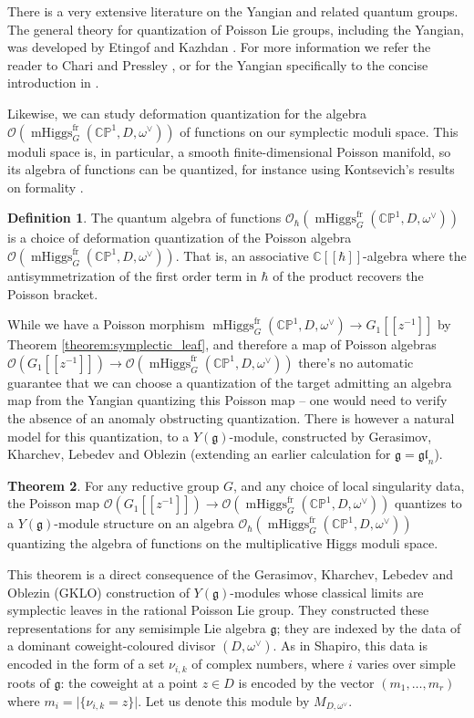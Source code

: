 \documentclass[11pt, oneside, reqno]{amsart}
\theoremstyle{definition} \newtheorem{definition}{Definition}[section]
\newtheorem{theorem}[definition]{Theorem}
\theoremstyle{definition} \newtheorem{remark}[definition]{Remark}
\theoremstyle{definition} \newtheorem{remarks}[definition]{Remarks}
\theoremstyle{definition} \newtheorem{question}[definition]{Question}
\theoremstyle{definition} \newtheorem*{note}{Note}
\theoremstyle{definition} \newtheorem{example}[definition]{Example}
\theoremstyle{definition} \newtheorem{examples}[definition]{Examples}
\renewcommand{\gg}{\mathfrak{g}}
\newcommand{\bb}[1]{\mathbb{#1}}
\newcommand{\CC}{\mathbb{C}}
\newcommand{\OO}{\mathcal{O}}
\newcommand{\gl}{\mathfrak{gl}}
\DeclareMathOperator{\mhiggs}{mHiggs}
\newcommand{\fr}{\mathrm{fr}}
\begin{document}
There is a very extensive literature on the Yangian and related quantum groups.  The general theory for quantization of Poisson Lie groups, including the Yangian, was developed by Etingof and Kazhdan \cite{EtingofKazhdanIII}.  For more information we refer the reader to Chari and Pressley \cite{ChariPressley}, or for the Yangian specifically to the concise introduction in \cite[Section 9]{CostelloYangian}.

Likewise, we can study deformation quantization for the algebra $\OO(\mhiggs^\fr_G(\bb{CP}^1,D,\omega^\vee))$ of functions on our symplectic moduli space.  This moduli space is, in particular, a smooth finite-dimensional Poisson manifold, so its algebra of functions can be quantized, for instance using Kontsevich's results on formality \cite{KontsevichQuantization}.

\begin{definition}
The quantum algebra of functions $\OO_\hbar(\mhiggs^\fr_G(\bb{CP}^1,D,\omega^\vee))$ is a choice of deformation quantization of the Poisson algebra $\OO(\mhiggs^\fr_G(\bb{CP}^1,D,\omega^\vee))$.  That is, an associative $\CC[[\hbar]]$-algebra where the antisymmetrization of the first order term in $\hbar$ of the product recovers the Poisson bracket. 
\end{definition}

While we have a Poisson morphism $\mhiggs^\fr_G(\bb{CP}^1,D,\omega^\vee) \to G_1[[z^{-1}]]$ by Theorem \ref{theorem:symplectic_leaf}, and therefore a map of Poisson algebras $\OO(G_1[[z^{-1}]]) \to \OO(\mhiggs^\fr_G(\bb{CP}^1,D,\omega^\vee))$ there's no automatic guarantee that we can choose a quantization of the target admitting an algebra map from the Yangian quantizing this Poisson map -- one would need to verify the absence of an anomaly obstructing quantization.  There is however a natural model for this quantization, to a $Y(\gg)$-module,  constructed by Gerasimov, Kharchev, Lebedev and Oblezin \cite{GKLO} (extending an earlier calculation \cite{GKL} for $\gg = \gl_n$).

\begin{theorem}
For any reductive group $G$, and any choice of local singularity data, the Poisson map $\OO(G_1[[z^{-1}]]) \to \OO(\mhiggs^\fr_G(\bb{CP}^1,D,\omega^\vee))$ quantizes to a $Y(\gg)$-module structure on an algebra $\OO_\hbar(\mhiggs^\fr_G(\bb{CP}^1,D,\omega^\vee))$ quantizing the algebra of functions on the multiplicative Higgs moduli space.  
\end{theorem}

This theorem is a direct consequence of the Gerasimov, Kharchev, Lebedev and Oblezin (GKLO) construction of $Y(\gg)$-modules whose classical limits are symplectic leaves in the rational Poisson Lie group.  They constructed these representations for any semisimple Lie algebra $\gg$; they are indexed by the data of a dominant coweight-coloured divisor $(D, \omega^\vee)$.  As in Shapiro, this data is encoded in the form of a set $\nu_{i,k}$ of complex numbers, where $i$ varies over simple roots of $\gg$: the coweight at a point $z \in D$ is encoded by the vector $(m_1, \ldots, m_r)$ where $m_i = \lvert\{\nu_{i,k} = z\}\rvert$.  Let us denote this module by $M_{D,\omega^\vee}$.
\end{document}
